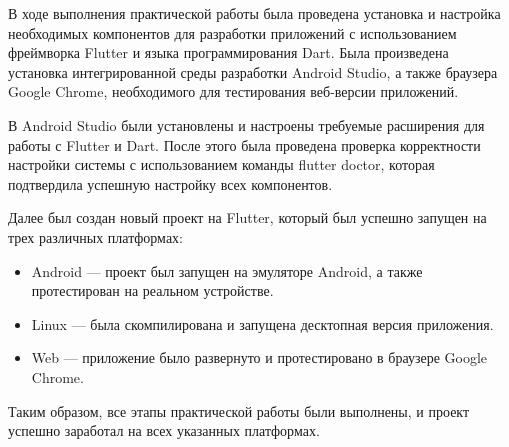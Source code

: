 В ходе выполнения практической работы была проведена установка
и настройка необходимых компонентов для разработки приложений
с использованием фреймворка Flutter и языка программирования Dart.
Была произведена установка интегрированной среды разработки Android Studio,
а также браузера Google Chrome,
необходимого для тестирования веб-версии приложений.\par
В Android Studio были установлены и настроены требуемые расширения
для работы с Flutter и Dart.
После этого была проведена проверка корректности настройки системы
с использованием команды flutter doctor,
которая подтвердила успешную настройку всех компонентов.\par
Далее был создан новый проект на Flutter,
который был успешно запущен на трех различных платформах:

\begin{itemize}
	\item Android --- проект был запущен на эмуляторе Android,
		а также протестирован на реальном устройстве.
	\item Linux --- была скомпилирована
		и запущена десктопная версия приложения.
	\item Web --- приложение было развернуто
		и протестировано в браузере Google Chrome.
\end{itemize}

Таким образом, все этапы практической работы были выполнены, и проект успешно заработал на всех указанных платформах.


